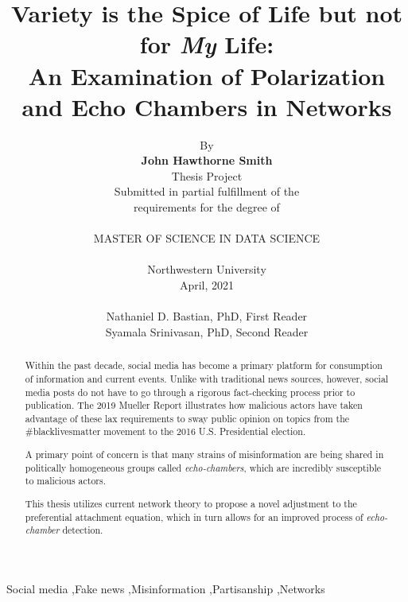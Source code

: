 \documentclass[preprint,review,12pt]{elsarticle}
\begin{document}
\begin{frontmatter}


\title{Variety is the Spice of Life but not for \textit{My} Life: \\ An Examination of Polarization and Echo Chambers in Networks}

\author{By \\\textbf{John Hawthorne Smith} \\Thesis Project \\Submitted in partial fulfillment of the \\requirements for the degree of \\ \\MASTER OF SCIENCE IN DATA SCIENCE \\ \\Northwestern University \\April, 2021 \\ \\Nathaniel D. Bastian, PhD, First Reader \\Syamala Srinivasan, PhD, Second Reader}




\begin{abstract}
Within the past decade, social media has become a primary platform for consumption of information and current events. Unlike with traditional news sources, however, social media posts do not have to go through a rigorous fact-checking process prior to publication. The 2019 Mueller Report illustrates how malicious actors have taken advantage of these lax requirements to sway public opinion on topics from the \#blacklivesmatter movement to the 2016 U.S. Presidential election. 

A primary point of concern is that many strains of misinformation are being shared in politically homogeneous groups called \textit{echo-chambers}, which are incredibly susceptible to malicious actors. 

This thesis utilizes current network theory to propose a novel adjustment to the preferential attachment equation, which in turn allows for an improved process of \textit{echo-chamber} detection.

\end{abstract}



\begin{keyword}
Social media \sep Fake news \sep Misinformation \sep Partisanship \sep Networks
\end{keyword}

\end{frontmatter}
\end{document}
